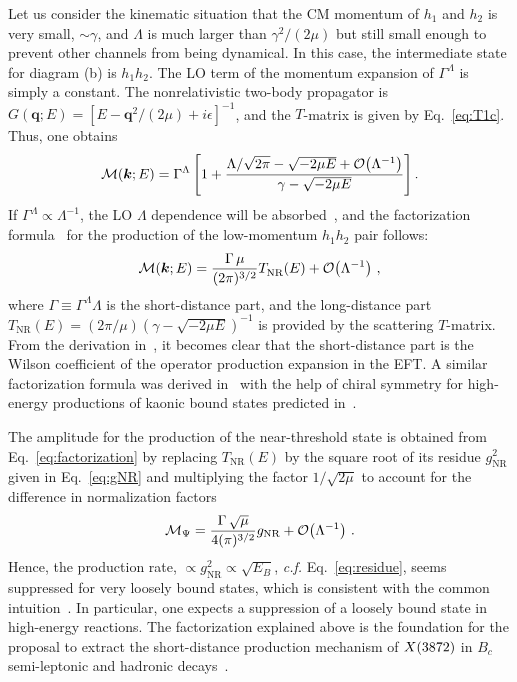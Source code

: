 Let us consider the kinematic situation that the CM momentum of
$h_1$ and $h_2$ is very small, $\sim \gamma$, and $\Lambda$ is much larger than
$\gamma^2/(2\mu)$ but still small enough to prevent other channels from being
dynamical. In this case, the intermediate state for diagram (b) is $h_1 h_2$.
The LO term of the momentum expansion of $\Gamma^\Lambda$ is simply a constant.
The nonrelativistic two-body propagator is $G(\bm q;E) = \left[ E - \bm
q^2/(2\mu) + i\epsilon \right]^{-1}$, and the $T$-matrix is given by
Eq.~\eqref{eq:T1c}. Thus, one obtains
\begin{equation}
  \mathcal{M}(\bm k;E)
  = \Gamma^\Lambda \left[ 1+ \frac{{\Lambda}/{\sqrt{2\pi}}
  -\sqrt{-2\mu E} + \mathcal{O}\!\left(\Lambda^{-1}\right)\!\,}{ \gamma -\sqrt{-2\mu E} } \right].
  \label{eq:Mfactorization}
\end{equation}
If $\Gamma^\Lambda\propto \Lambda^{-1}$, the LO $\Lambda$ dependence will be
absorbed~\cite{Braaten:2004ai}, and the factorization
formula~\cite{Braaten:2004ai,Braaten:2004fk,Braaten:2005jj} for the production
of the low-momentum $h_1h_2$ pair follows:
\begin{equation}
  \mathcal{M}(\bm k;E)
  = \frac{\Gamma\,\mu}{(2\pi)^{3/2}} T_\text{NR}^{}(E) + \mathcal{O}\!\left(\Lambda^{-1}\right)\!\,\,,
  \label{eq:factorization}
\end{equation}
where $\Gamma\equiv\Gamma^\Lambda\Lambda$ is the short-distance part, and the
long-distance part
$T_\text{NR}^{}(E)=(2\pi/\mu)\left(\gamma -\sqrt{-2\mu E} \right)^{-1} $ is
provided by the scattering $T$-matrix. From the derivation
in~\cite{Braaten:2006sy}, it becomes
clear that the
short-distance part is the Wilson coefficient of the operator production
expansion in the EFT.
A similar factorization formula was derived in~\cite{Guo:2014ppa} with the help
of chiral symmetry for high-energy productions of kaonic bound states predicted
in~\cite{Guo:2011dd}.

The amplitude for the production of the
near-threshold state  is obtained from Eq.~\eqref{eq:factorization} by
replacing $T_\text{NR}^{}(E)$ by the square root of its residue
$g_\text{NR}^{2}$
given in Eq.~\eqref{eq:gNR} and multiplying the factor $1/\sqrt{2\mu}$ to
account for the difference in normalization factors
\begin{equation}
  \mathcal{M}_\Psi
  = \frac{\Gamma\,\sqrt{\mu}}{4(\pi)^{3/2}} g_\text{NR} +
\mathcal{O}\!\left(\Lambda^{-1}\right)\!\,\,.
  \label{eq:factorizationX}
\end{equation}
Hence, the production rate, $\propto
g_\text{NR}^2\propto \sqrt{E_B}$, {\sl c.f.}  Eq.~\eqref{eq:residue}, seems
suppressed for very loosely bound states,
which is consistent with the common
intuition~\cite{Braaten:2004fk,Artoisenet:2009wk}.
In particular, one expects a suppression of
a loosely bound state in high-energy reactions.
The factorization explained above is the foundation for the proposal to extract
the short-distance production mechanism of $X(3872)$ in $B_c$ semi-leptonic and
hadronic decays~\cite{Wang:2015rcz}.



